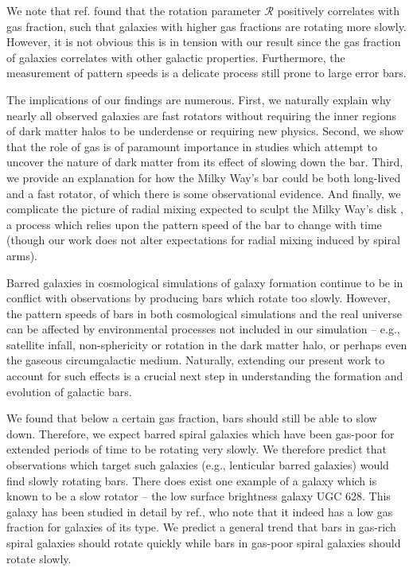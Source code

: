 \documentclass[twoside]{natureprintstyle}
\newcommand{\Rot}{\ensuremath{\mathcal{R}}}
\begin{document}
We note that ref.\cite{2020MNRAS.491.3655G} found that the rotation parameter
\Rot{} positively correlates with gas fraction, such that galaxies with higher
gas fractions are rotating more slowly. However, it is not obvious this is in
tension with our result since the gas fraction of galaxies correlates with
other galactic properties.\cite{2009ARAA..47..159B} Furthermore, the
measurement of pattern speeds is a delicate process still prone to large error
bars.

The implications of our findings are numerous. First, we naturally explain why
nearly all observed galaxies are fast rotators without requiring the inner
regions of dark matter halos to be underdense\cite{1998ApJ...493L...5D,
2000ApJ...543..704D} or requiring new physics.\cite{2021MNRAS.503.2833R,
2021MNRAS.508..926R} Second, we show that the role of gas is of paramount
importance in studies which attempt to uncover the nature of dark matter from
its effect of slowing down the bar.\cite{2021MNRAS.500.4710C,
2021MNRAS.505.2412C} Third, we provide an explanation for how the Milky Way's
bar could be both long-lived and a fast rotator, of which there is some
observational evidence.\cite{2019MNRAS.490.4740B} And finally, we complicate
the picture of radial mixing expected to sculpt the Milky Way's disk
\cite{2012MNRAS.420..913B, 2015ApJ...808..132H}, a process which relies upon
the pattern speed of the bar to change with time (though our work does not
alter expectations for radial mixing induced by spiral
arms\cite{2002MNRAS.336..785S}).

Barred galaxies in cosmological simulations of galaxy formation continue to be
in conflict with observations by producing bars which rotate too
slowly.\cite{2017MNRAS.469.1054A, 2019MNRAS.483.2721P, 2021AA...650L..16F}
However, the pattern speeds of bars in both cosmological simulations and the
real universe can be affected by environmental processes not included in our
simulation -- e.g., satellite infall\cite{2011Natur.477..301P},
non-sphericity\cite{2013MNRAS.429.1949A} or rotation\cite{2013MNRAS.434.1287S,
2014ApJ...783L..18L, 2018MNRAS.476.1331C, 2019MNRAS.488.5788C} in the dark
matter halo, or perhaps even the gaseous circumgalactic medium. Naturally,
extending our present work to account for such effects is a crucial next step
in understanding the formation and evolution of galactic bars.

We found that below a certain gas fraction, bars should still be able to slow
down. Therefore, we expect barred spiral galaxies which have been gas-poor for
extended periods of time to be rotating very slowly. We therefore predict that
observations which target such galaxies (e.g., lenticular barred
galaxies\cite{2009ARAA..47..159B}) would find slowly rotating bars. There does
exist one example of a galaxy which is known to be a slow rotator -- the
low surface brightness galaxy UGC 628.\cite{2009AA...499L..25C} This galaxy
has been studied in detail by ref.\cite{2016MNRAS.463.1751C}, who note that it
indeed has a low gas fraction for galaxies of its type. We predict a general
trend that bars in gas-rich spiral galaxies should rotate quickly while bars
in gas-poor spiral galaxies should rotate slowly.
\end{document}
